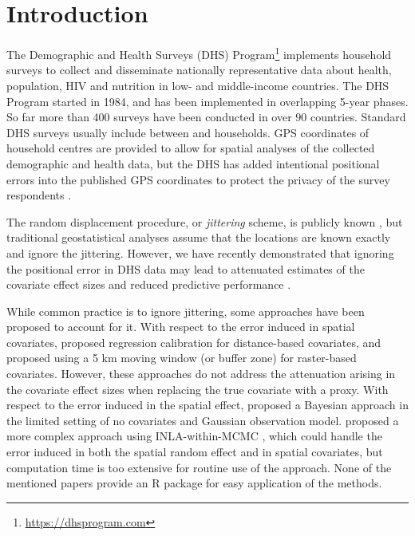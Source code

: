 \section{Introduction}

The Demographic and Health Surveys (DHS) Program\footnote{\url{https://dhsprogram.com}} implements household surveys to collect and disseminate nationally representative data about health, population, HIV and nutrition in low- and middle-income countries. The DHS Program started in 1984, and has been implemented in overlapping 5-year phases. So far more than 400 surveys have been conducted in over $90$ countries. Standard DHS surveys usually include between  and  households. GPS coordinates of household centres are provided to allow for spatial analyses of the collected demographic and health data, but the DHS has added intentional positional errors into the published GPS coordinates to protect the privacy of the survey respondents \citep{DHSspatial07}.

The random displacement procedure, or \emph{jittering} scheme, is publicly known \citep{DHSspatial07}, but traditional geostatistical analyses assume that the locations are known exactly and ignore the jittering. However, we have recently demonstrated that ignoring the positional error in DHS data may lead to attenuated estimates of the covariate effect sizes and reduced predictive performance \citep{altay2022covariates}. 

While common practice is to ignore jittering, some approaches have been proposed to account for it. With respect to the error induced in spatial covariates, \citet{warren2016influenceOne} proposed regression calibration for distance-based covariates, and \citet{perez2013guidelines,perez2016influence} proposed using a 5 km moving window (or buffer zone) for raster-based covariates. However, these approaches do not address the attenuation arising in the covariate effect sizes when replacing the true covariate with a proxy. With respect to the error induced in the spatial effect, \citet{fanshawe2011spatial} proposed a Bayesian approach in the limited setting of no covariates and Gaussian observation model. \citet{wilson2021estimation} proposed a more complex approach using INLA-within-MCMC \citep{rue2009approximate, gomez2018markov}, which could handle the error induced in both the spatial random effect and in spatial covariates, but computation time is too extensive for routine use of the approach. None of the mentioned papers provide an R package for easy application of the methods.

